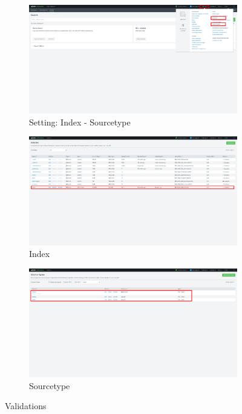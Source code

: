 \documentclass[report]{article}
\begin{document}
\begin{figure}[h!]
  \centering
  \begin{subfigure}[b]{0.49\linewidth}
    \includegraphics[width=\linewidth]{img/f.png}
     \caption{\color{text} Setting: Index - Sourcetype}
  \end{subfigure}
  \begin{subfigure}[b]{0.49\linewidth}
    \includegraphics[width=\linewidth]{img/d.png}
    \caption{\color{text} Index}
  \end{subfigure}
  \begin{subfigure}[b]{0.49\linewidth}
    \includegraphics[width=\linewidth]{img/e.png}
    \caption{\color{text} Sourcetype}
  \end{subfigure}
  \caption{\color{text} Validations}
  \label{fig:validacion}
\end{figure}
\end{document}
